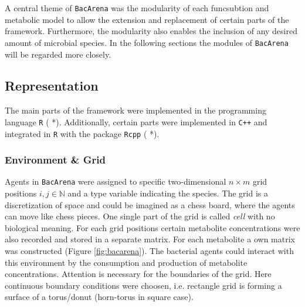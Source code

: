 A central theme of \texttt{BacArena} was the modularity of each funcsubtion and metabolic model to allow the extension and replacement of certain parts of the framework. Furthermore, the modularity also enables the inclusion of any desired amount of microbial species. In the following sections the modules of \texttt{BacArena} will be regarded more closely. 

\subsection{Representation}
The main parts of the framework were implemented in the programming language \texttt{R} ( *). Additionally, certain parts were implemented in \texttt{C++} and integrated in \texttt{R} with the package \texttt{Rcpp} ( *).

\subsubsection{Environment \& Grid}
Agents in \texttt{BacArena} were assigned to specific two-dimensional $n \times m$ grid positions $i, j \in \mathbb{N}$ and a type variable indicating the species. The grid is a discretization of space and could be imagined as a chess board, where the agents can move like chess pieces. 
One single part of the grid is called \textit{cell} with no biological meaning.
For each grid positions certain metabolite concentrations were also recorded and stored in a separate matrix. For each metabolite a own matrix was constructed (Figure \hyperref[fig:bacarena]{\ref{fig:bacarena}}). The bacterial agents could interact with this environment by the consumption and production of metabolite concentrations.
Attention is necessary for the boundaries of the grid.
Here continuous boundary conditions were choosen, i.e. rectangle grid is forming a surface of a torus/donut (horn-torus in square case).

